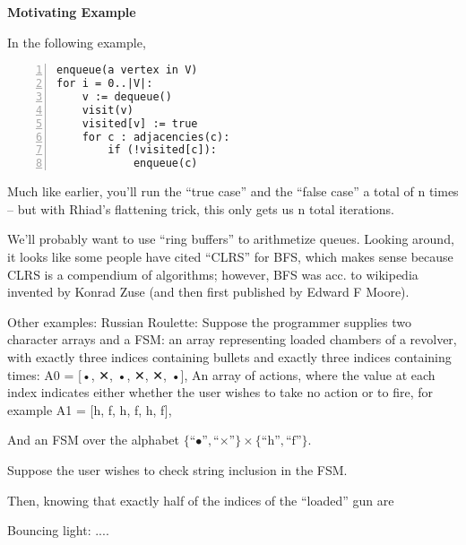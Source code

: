 \textbf{Motivating Example}


In the following example,
\begin{Verbatim}[numbers=left]
enqueue(a vertex in V)
for i = 0..|V|:
    v := dequeue()
    visit(v)
    visited[v] := true
    for c : adjacencies(c):
        if (!visited[c]):
            enqueue(c)
\end{Verbatim}

Much like earlier, you'll run the ``true case'' and the ``false case'' a total of n times --
but with Rhiad's flattening trick, this only gets us n total iterations.

We'll probably want to use ``ring buffers'' to arithmetize queues.
Looking around, it looks like some people have cited ``CLRS'' for BFS, which makes sense because
CLRS is a compendium of algorithms; however, BFS was acc. to wikipedia invented by Konrad Zuse (and then first published by Edward F Moore).

Other examples:
Russian Roulette:
Suppose the programmer supplies two character arrays and a FSM: an array representing loaded chambers of a revolver, with exactly three indices containing
bullets and exactly three indices containing times:
A0 = [•, ✕, •, ✕, ✕, •],
An array of actions, where the value at each index indicates either whether the user wishes to take no action or to fire, for example
A1 = [h, f, h, f, h, f],

And an FSM over the alphabet $\{\mbox{``•''}, \mbox{``×''}\}×\{\mbox{``h''}, \mbox{``f''}\}$.

Suppose the user wishes to check string inclusion in the FSM.

Then, knowing that exactly half of the indices of the ``loaded'' gun are 


Bouncing light:
....